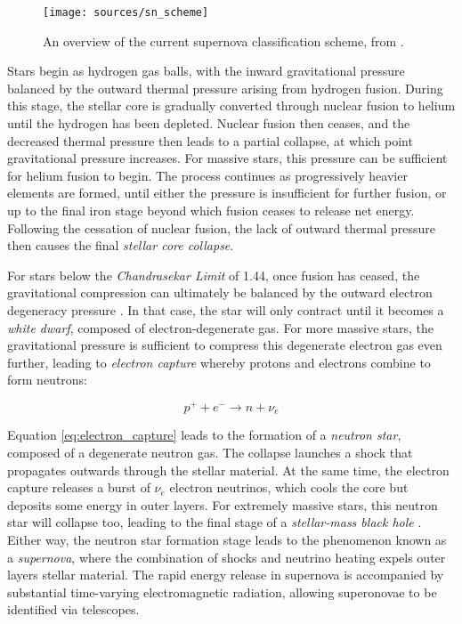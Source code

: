 \begin{figure}[!ht]
	\texttt{[image: sources/sn\_scheme]}
	\caption{An overview of the current supernova classification scheme, from \cite{sn_classification}.}
	\label{fig:snzoo}
\end{figure}

Stars begin as hydrogen gas balls, with the inward gravitational pressure balanced by the outward thermal pressure arising from hydrogen fusion. During this stage, the stellar core is gradually converted through nuclear fusion to helium until the hydrogen has been depleted. Nuclear fusion then ceases, and the decreased thermal pressure then leads to a partial collapse, at which point gravitational pressure increases. For massive stars, this pressure can be sufficient for helium fusion to begin. The process continues as progressively heavier elements are formed, until either the pressure is insufficient for further fusion, or up to the final iron stage beyond which fusion ceases to release net energy. Following the cessation of nuclear fusion, the lack of outward thermal pressure then causes the final \emph{stellar core collapse}.

For stars below the \emph{Chandrasekar Limit} of 1.44\Msol {}, once fusion has ceased, the gravitational compression can ultimately be balanced by the outward electron degeneracy pressure . In that case, the star will only contract until it becomes a \emph{white dwarf}, composed of electron-degenerate gas. For more massive stars, the gravitational pressure is sufficient to compress this degenerate electron gas even further, leading to \emph{electron capture} whereby protons and electrons combine to form neutrons:

\begin{equation}
	p^{+} + e^{-} \rightarrow n + \nu_{e}
\label{eq:electron_capture}
\end{equation}

Equation \ref{eq:electron_capture} leads to the formation of a \emph{neutron star}, composed of a degenerate neutron gas. The collapse launches a shock that propagates outwards through the stellar material. At the same time, the electron capture releases a burst of $\nu_{e}$ electron neutrinos, which cools the core but deposits some energy in outer layers. For extremely massive stars, this neutron star will collapse too, leading to the final stage of a \emph{stellar-mass black hole} . Either way, the neutron star formation stage leads to the phenomenon known as a \emph{supernova}, where the combination of shocks and neutrino heating expels outer layers stellar material. The rapid energy release in supernova is accompanied by substantial time-varying electromagnetic radiation, allowing superonovae to be identified via telescopes.

